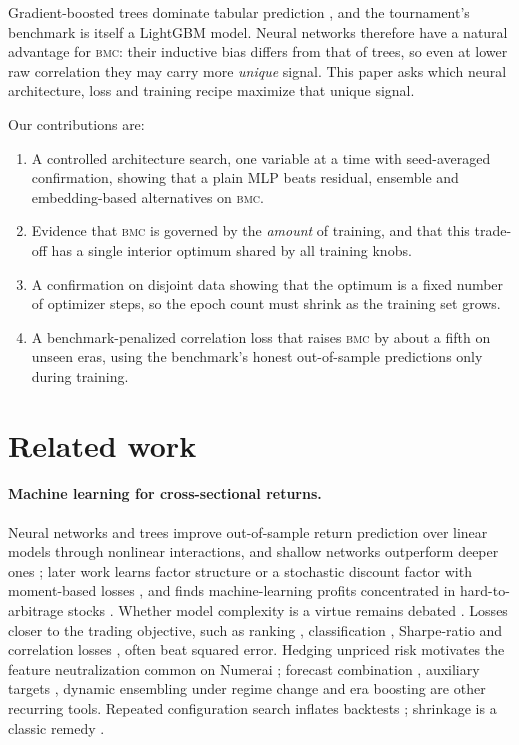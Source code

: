 \documentclass[11pt]{article}
\newcommand{\bmc}{\textsc{bmc}}
\begin{document}
Gradient-boosted trees dominate tabular prediction \citep{grinsztajn2022tree}, and the
tournament's benchmark is itself a LightGBM model. Neural networks therefore have a natural
advantage for \bmc{}: their inductive bias differs from that of trees, so even at lower raw
correlation they may carry more \emph{unique} signal. This paper asks which neural
architecture, loss and training recipe maximize that unique signal.

Our contributions are:
\begin{enumerate}
  \item A controlled architecture search, one variable at a time with seed-averaged
        confirmation, showing that a plain MLP beats residual, ensemble and embedding-based
        alternatives on \bmc{}.
  \item Evidence that \bmc{} is governed by the \emph{amount} of training, and that this
        trade-off has a single interior optimum shared by all training knobs.
  \item A confirmation on disjoint data showing that the optimum is a fixed number of
        optimizer steps, so the epoch count must shrink as the training set grows.
  \item A benchmark-penalized correlation loss that raises \bmc{} by about a fifth on unseen
        eras, using the benchmark's honest out-of-sample predictions only during training.
\end{enumerate}

\section{Related work}

\paragraph{Machine learning for cross-sectional returns.}
Neural networks and trees improve out-of-sample return prediction over linear models through
nonlinear interactions, and shallow networks outperform deeper ones \citep{gu2020empirical};
later work learns factor structure \citep{gu2021autoencoder} or a stochastic discount factor
with moment-based losses \citep{chen2024deep}, and finds machine-learning profits concentrated
in hard-to-arbitrage stocks \citep{avramov2023machine}. Whether model complexity is a virtue
\citep{kelly2024virtue} remains debated \citep{nagel2025seemingly,fallahgoul2025high}.
Losses closer to the trading objective, such as ranking \citep{poh2020building,lin2026lambdarankic},
classification \citep{bai2021classification}, Sharpe-ratio \citep{zhang2020deep} and
correlation losses \citep{forum_custom_loss}, often beat squared error. Hedging unpriced risk
\citep{daniel2020cross} motivates the feature neutralization common on Numerai
\citep{forum_neutralization_intro,forum_neutralization_bias}; forecast combination
\citep{rapach2010out}, auxiliary targets \citep{forum_new_targets}, dynamic ensembling under
regime change \citep{wong2023online} and era boosting \citep{forum_era_boosting} are other
recurring tools. Repeated configuration search inflates backtests
\citep{bailey2014deflated,bailey2017probability,arian2024backtest}; shrinkage is a classic
remedy \citep{kozak2020shrinking}.
\end{document}

